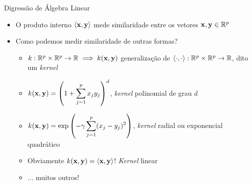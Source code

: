 \begin{frame}{Digressão de Álgebra Linear}
    \begin{itemize}
        \item O produto interno $\langle {\bf x}, {\bf y} \rangle$ mede \alert{similaridade} entre os vetores ${\bf x}, {\bf y} \in \mathbb{R}^p$
        
        \pause
        
        \item Como podemos medir similaridade de outras formas?
        
        \pause
        
        \begin{itemize}
            \item $k: \mathbb{R}^p \times \mathbb{R}^p \to \mathbb{R} \implies k({\bf x}, {\bf y})$ generalização de $\langle \cdot, \cdot \rangle: \mathbb{R}^p \times \mathbb{R}^p \to \mathbb{R}$, dito um \alert{\textit{kernel}}
            
            \pause
            
            \item $\displaystyle k({\bf x}, {\bf y}) = \left(1 + \sum_{j = 1}^{p} x_j y_j \right)^d$, \textit{kernel} polinomial de grau $d$
            
            \pause
            
            \item $\displaystyle k({\bf x}, {\bf y}) = \exp\left(-\gamma \sum_{j = 1}^{p} (x_j - y_j)^2 \right)$, \textit{kernel} radial ou exponencial quadrático
            
            \pause
            
            \item Obviamente $k({\bf x}, {\bf y}) = \langle {\bf x}, {\bf y} \rangle$! \textit{Kernel} linear
            
            \pause
            
            \item ... muitos outros!
        \end{itemize}
    \end{itemize}
\end{frame}




